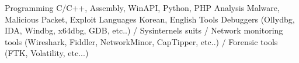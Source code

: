 \begin{cvskills}
  \cvskill
    {Programming}
    {C/C++, Assembly, WinAPI, Python, PHP}
  \cvskill
    {Analysis}
    {Malware, Malicious Packet, Exploit}
  \cvskill
    {Languages}
    {Korean, English}
  \cvskill
    {Tools}
    {Debuggers (Ollydbg, IDA, Windbg, x64dbg, GDB, etc..) / Sysinternels suits / Network monitoring tools (Wireshark, Fiddler, NetworkMinor, CapTipper, etc..) / Forensic tools (FTK, Volatility, etc...)}
\end{cvskills}
